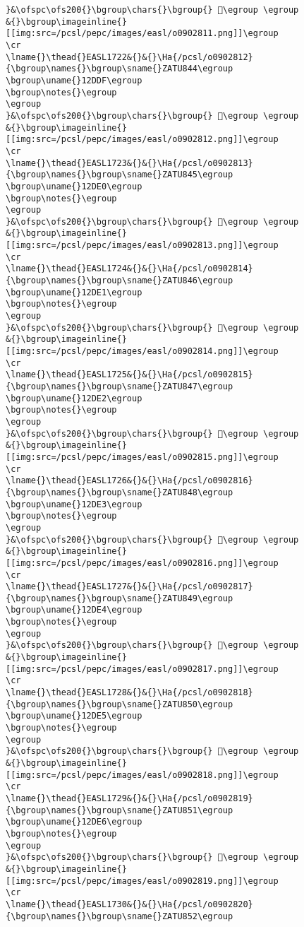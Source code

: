 \begin{verbatim}
}&\ofspc\ofs200{}\bgroup\chars{}\bgroup{} 𒷞\egroup \egroup
&{}\bgroup\imageinline{}[[img:src=/pcsl/pepc/images/easl/o0902811.png]]\egroup
\cr
\lname{}\thead{}EASL1722&{}&{}\Ha{/pcsl/o0902812}{\bgroup\names{}\bgroup\sname{}ZATU844\egroup
\bgroup\uname{}12DDF\egroup
\bgroup\notes{}\egroup
\egroup
}&\ofspc\ofs200{}\bgroup\chars{}\bgroup{} 𒷟\egroup \egroup
&{}\bgroup\imageinline{}[[img:src=/pcsl/pepc/images/easl/o0902812.png]]\egroup
\cr
\lname{}\thead{}EASL1723&{}&{}\Ha{/pcsl/o0902813}{\bgroup\names{}\bgroup\sname{}ZATU845\egroup
\bgroup\uname{}12DE0\egroup
\bgroup\notes{}\egroup
\egroup
}&\ofspc\ofs200{}\bgroup\chars{}\bgroup{} 𒷠\egroup \egroup
&{}\bgroup\imageinline{}[[img:src=/pcsl/pepc/images/easl/o0902813.png]]\egroup
\cr
\lname{}\thead{}EASL1724&{}&{}\Ha{/pcsl/o0902814}{\bgroup\names{}\bgroup\sname{}ZATU846\egroup
\bgroup\uname{}12DE1\egroup
\bgroup\notes{}\egroup
\egroup
}&\ofspc\ofs200{}\bgroup\chars{}\bgroup{} 𒷡\egroup \egroup
&{}\bgroup\imageinline{}[[img:src=/pcsl/pepc/images/easl/o0902814.png]]\egroup
\cr
\lname{}\thead{}EASL1725&{}&{}\Ha{/pcsl/o0902815}{\bgroup\names{}\bgroup\sname{}ZATU847\egroup
\bgroup\uname{}12DE2\egroup
\bgroup\notes{}\egroup
\egroup
}&\ofspc\ofs200{}\bgroup\chars{}\bgroup{} 𒷢\egroup \egroup
&{}\bgroup\imageinline{}[[img:src=/pcsl/pepc/images/easl/o0902815.png]]\egroup
\cr
\lname{}\thead{}EASL1726&{}&{}\Ha{/pcsl/o0902816}{\bgroup\names{}\bgroup\sname{}ZATU848\egroup
\bgroup\uname{}12DE3\egroup
\bgroup\notes{}\egroup
\egroup
}&\ofspc\ofs200{}\bgroup\chars{}\bgroup{} 𒷣\egroup \egroup
&{}\bgroup\imageinline{}[[img:src=/pcsl/pepc/images/easl/o0902816.png]]\egroup
\cr
\lname{}\thead{}EASL1727&{}&{}\Ha{/pcsl/o0902817}{\bgroup\names{}\bgroup\sname{}ZATU849\egroup
\bgroup\uname{}12DE4\egroup
\bgroup\notes{}\egroup
\egroup
}&\ofspc\ofs200{}\bgroup\chars{}\bgroup{} 𒷤\egroup \egroup
&{}\bgroup\imageinline{}[[img:src=/pcsl/pepc/images/easl/o0902817.png]]\egroup
\cr
\lname{}\thead{}EASL1728&{}&{}\Ha{/pcsl/o0902818}{\bgroup\names{}\bgroup\sname{}ZATU850\egroup
\bgroup\uname{}12DE5\egroup
\bgroup\notes{}\egroup
\egroup
}&\ofspc\ofs200{}\bgroup\chars{}\bgroup{} 𒷥\egroup \egroup
&{}\bgroup\imageinline{}[[img:src=/pcsl/pepc/images/easl/o0902818.png]]\egroup
\cr
\lname{}\thead{}EASL1729&{}&{}\Ha{/pcsl/o0902819}{\bgroup\names{}\bgroup\sname{}ZATU851\egroup
\bgroup\uname{}12DE6\egroup
\bgroup\notes{}\egroup
\egroup
}&\ofspc\ofs200{}\bgroup\chars{}\bgroup{} 𒷦\egroup \egroup
&{}\bgroup\imageinline{}[[img:src=/pcsl/pepc/images/easl/o0902819.png]]\egroup
\cr
\lname{}\thead{}EASL1730&{}&{}\Ha{/pcsl/o0902820}{\bgroup\names{}\bgroup\sname{}ZATU852\egroup

\end{verbatim}
